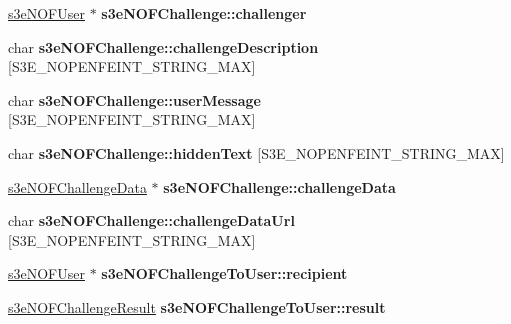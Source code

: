 \begin{DoxyCompactItemize}
\item 
\hypertarget{group___n_open_feint_api_group_ga1c8dbfd19cf4b9f8ec94350247bcdcb7}{
\hyperlink{structs3e_n_o_f_user}{s3eNOFUser} $\ast$ {\bfseries s3eNOFChallenge::challenger}}
\label{group___n_open_feint_api_group_ga1c8dbfd19cf4b9f8ec94350247bcdcb7}

\item 
\hypertarget{group___n_open_feint_api_group_ga26fc42a6ce20db337578eaecf96f0914}{
char {\bfseries s3eNOFChallenge::challengeDescription} \mbox{[}S3E\_\-NOPENFEINT\_\-STRING\_\-MAX\mbox{]}}
\label{group___n_open_feint_api_group_ga26fc42a6ce20db337578eaecf96f0914}

\item 
\hypertarget{group___n_open_feint_api_group_ga39c79347e6372fce8673936899cfcda1}{
char {\bfseries s3eNOFChallenge::userMessage} \mbox{[}S3E\_\-NOPENFEINT\_\-STRING\_\-MAX\mbox{]}}
\label{group___n_open_feint_api_group_ga39c79347e6372fce8673936899cfcda1}

\item 
\hypertarget{group___n_open_feint_api_group_gaf63ff301a7be88e3180d1a152c376ac7}{
char {\bfseries s3eNOFChallenge::hiddenText} \mbox{[}S3E\_\-NOPENFEINT\_\-STRING\_\-MAX\mbox{]}}
\label{group___n_open_feint_api_group_gaf63ff301a7be88e3180d1a152c376ac7}

\item 
\hypertarget{group___n_open_feint_api_group_gaec7022a723b75796a1c028d9e1df1034}{
\hyperlink{structs3e_n_o_f_challenge_data}{s3eNOFChallengeData} $\ast$ {\bfseries s3eNOFChallenge::challengeData}}
\label{group___n_open_feint_api_group_gaec7022a723b75796a1c028d9e1df1034}

\item 
\hypertarget{group___n_open_feint_api_group_ga47456af3464434e78f5719f7c05e0985}{
char {\bfseries s3eNOFChallenge::challengeDataUrl} \mbox{[}S3E\_\-NOPENFEINT\_\-STRING\_\-MAX\mbox{]}}
\label{group___n_open_feint_api_group_ga47456af3464434e78f5719f7c05e0985}

\item 
\hypertarget{group___n_open_feint_api_group_gadb660e1877f1ba45608b5543b4a865ff}{
\hyperlink{structs3e_n_o_f_user}{s3eNOFUser} $\ast$ {\bfseries s3eNOFChallengeToUser::recipient}}
\label{group___n_open_feint_api_group_gadb660e1877f1ba45608b5543b4a865ff}

\item 
\hypertarget{group___n_open_feint_api_group_ga59642af50d8113fbcf9064285e7df1ea}{
\hyperlink{group___n_open_feint_api_group_ga954444cdbeafa2947e969f78ed1e29f4}{s3eNOFChallengeResult} {\bfseries s3eNOFChallengeToUser::result}}
\label{group___n_open_feint_api_group_ga59642af50d8113fbcf9064285e7df1ea}


\end{DoxyCompactItemize}
